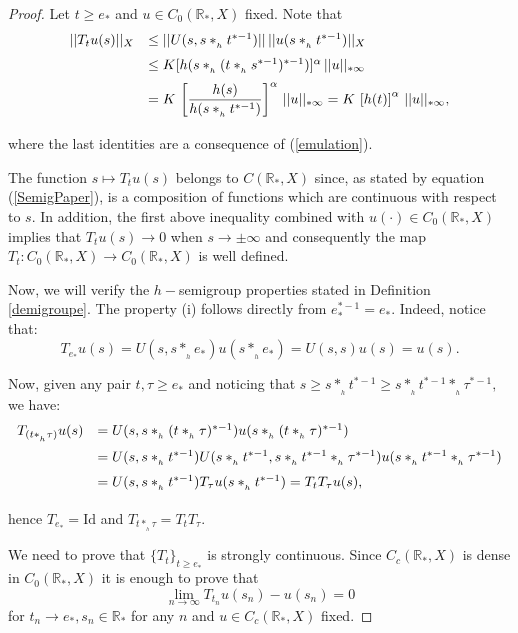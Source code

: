 \documentclass[10pt,a4paper]{amsart}
\begin{document}
\begin{proof}
 Let $t \ge e_*$ and $u \in C_0(\mathbb{R}_*, X)$ fixed. Note that
 $$
 \begin{array}{rl}
 \medskip
 ||T_tu(s)||_X &   \le ||U(s, s*_{_h}t^{*-1})|| \,  ||u(s*_{_h}t^{*-1})||_X \\
 \medskip
      & \le K [h(s*_{_h}(t*_{_h}s^{*-1})^{*-1})]^\alpha \, ||u||_{*\infty} \\
      \medskip
& = K \displaystyle \, \left[ \frac{h(s)}{h(s*_{_h}t^{*-1})}\right]^\alpha \, ||u||_{*\infty}  = K \displaystyle \, \left[h(t)\right]^\alpha \, ||u||_{*\infty},
      \end{array}
 $$ 
where the last identities are a consequence of (\ref{emulation}). 

The function  $s\mapsto T_{t}u(s)$ belongs to $C(\mathbb{R}_{*},X)$ since, as stated by equation (\ref{SemigPaper}),
is a composition of functions which are continuous with respect to $s$. In addition, the first above inequality  combined with $u(\cdot)\in C_{0}(\mathbb{R}_*, X)$ implies that $T_tu(s) \to 0$ when $s \to \pm \infty$ and consequently the map $T_t: C_0(\mathbb{R}_*, X) \to C_0(\mathbb{R}_*, X) $ is well defined.  

Now, we will verify the $h-$semigroup properties stated in Definition \ref{demigroupe}. The property (i) follows
directly from $e_{*}^{*-1}=e_{*}$. Indeed, notice that:
\begin{displaymath}
T_{e_*} u(s) = U(s,s*_{_h}e_*) u(s*_{_h}e_*) = U(s,s) u(s) = u(s).
\end{displaymath}

Now, given any pair $t, \tau \ge e_*$ and noticing that   $s \ge s*_{_h}t^{*-1} \ge s*_{_h}t^{*-1}*_{_h} \tau^{*-1},$ we have: 
$$\begin{array}{rl} 
\medskip T_{(t*_{_h}\tau)} u(s) & = U(s,s*_{_h}(t*_{_h}\tau)^{*-1}) u(s*_{_h}(t*_{_h}\tau)^{*-1})\\
\medskip 
& = U(s,s*_{_h}t^{*-1}) U(s*_{_h}t^{*-1},s*_{_h}t^{*-1}*_{_h}\tau^{*-1}) u(s*_{_h} t^{*-1}*_{_h}\tau^{*-1})\\
\medskip
& =  U(s,s*_{_h}t^{*-1}) T_\tau u(s*_{_h}t^{*-1}) = T_t T_\tau u(s),
\end{array} 
$$   
hence $T_{e_*} = \mathrm{Id}$ and $T_{t*_{_h}\tau} = T_tT_\tau.$ 

\medskip

We need to prove that $\{T_t\}_{t\ge e_*}$ is strongly continuous. Since $C_c(\mathbb{R}_*, X)$ is dense in $C_0(\mathbb{R}_*, X)$  it is enough to prove that
$$
\lim_{n \to \infty} T_{t_n}u(s_n) - u(s_n) = 0 
$$
for $t_n \to e_*, s_n \in \mathbb{R}_*$ for any $n$ and $u \in C_c(\mathbb{R}_*, X)$ fixed. 


\end{proof}
\end{document}
